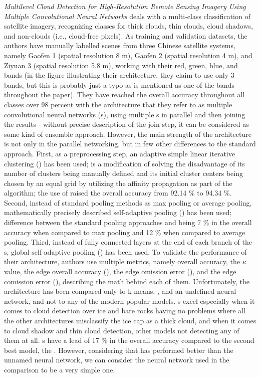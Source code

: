 \textit{Multilevel Cloud Detection for High-Resolution Remote Sensing Imagery Using Multiple Convolutional Neural Networks} deals with a multi-class classification of satellite imagery, recognizing classes for thick clouds, thin clouds, cloud shadows, and non-clouds (i.e., cloud-free pixels). As training and validation datasets, the authors have manually labelled scenes from three Chinese satellite systems, namely Gaofen 1 (spatial resolution 8 m), Gaofen 2 (spatial resolution 4 m), and Ziyuan 3 (spatial resolution 5.8 m), working with their red, green, blue, and  bands (in the figure illustrating their architecture, they claim to use only 3 bands, but this is probably just a typo as  is mentioned as one of the bands throughout the paper). They have reached the overall accuracy throughout all classes over 98 percent with the architecture that they refer to as multiple convolutional neural networks (s), using multiple s in parallel and then joining the results - without precise description of the join step, it can be considered as some kind of ensemble approach. However, the main strength of the architecture is not only in the parallel networking, but in few other differences to the standard approach. First, as a preprocessing step, an adaptive simple linear iterative clustering () has been used;  is a modification of  \cite{slic} solving the disadvantage of its number of clusters being manually defined and its initial cluster centers being chosen by an equal grid by utilizing the affinity propagation as part of the algorithm; the use of  raised the overall accuracy from 92.14 \% to 94.34 \%. Second, instead of standard pooling methods as max pooling or average pooling, mathematically precisely described self-adaptive pooling () has been used; difference between the standard pooling approaches and  being 7 \% in the overall accuracy when compared to max pooling and 12 \% when compared to average pooling. Third, instead of fully connected layers at the end of each branch of the s, global self-adaptive pooling () has been used. To validate the performance of their architecture, authors use multiple metrics, namely overall accuracy, the $\kappa$ value, the edge overall accuracy (), the edge omission error (), and the edge comission error (), describing the math behind each of them. Unfortunately, the architecture has been compared only to k-means, , and an undefined neural network, and not to any of the modern popular models. s excel especially when it comes to cloud detection over ice and bare rocks having no problems where all the other architectures misclassify the ice cap as a thick cloud, and when it comes to cloud shadow and thin cloud detection, other models not detecting any of them at all. s have a lead of 17 \% in the overall accuracy compared to the second best model, the . However, considering that  has performed better than the unnamed neural network, we can consider the neural network used in the comparison to be a very simple one.

